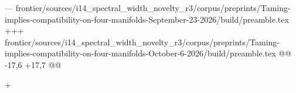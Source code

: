 --- frontier/sources/i14_spectral_width_novelty_r3/corpus/preprints/Taming-implies-compatibility-on-four-manifolds-September-23-2026/build/preamble.tex
+++ frontier/sources/i14_spectral_width_novelty_r3/corpus/preprints/Taming-implies-compatibility-on-four-manifolds-October-6-2026/build/preamble.tex
@@ -17,6 +17,7 @@
 \newtheorem{corollary}[theorem]{Corollary}
 \theoremstyle{remark}
 \newtheorem{remark}[theorem]{Remark}
+\newtheorem{example}[theorem]{Example}
 \newcommand{\R}{\mathbb R}
 \newcommand{\vol}{\,dV_g}
